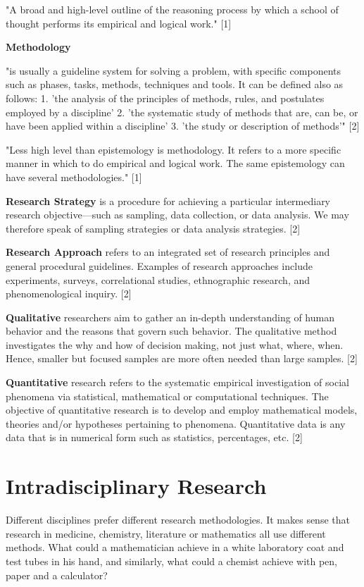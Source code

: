 "A broad and high-level outline of the reasoning process by which a school of thought performs its empirical and logical work." [1]

\textbf{Methodology}

"is usually a guideline system for solving a problem, with specific components such as phases, tasks, methods, techniques and tools. It can be defined also as follows: 1.	'the analysis of the principles of methods, rules, and postulates employed by a discipline' 2.	'the systematic study of methods that are, can be, or have been applied within a discipline' 3.	'the study or description of methods'" [2]

"Less high level than epistemology is methodology. It refers to a more specific manner in which to do empirical and logical work. The same epistemology can have several methodologies." [1]

\textbf{Research Strategy}
is a procedure for achieving a particular intermediary research objective—such as sampling, data collection, or data analysis. We may therefore speak of sampling strategies or data analysis strategies. [2]

\textbf{Research Approach}
refers to an integrated set of research principles and general procedural guidelines. Examples of research approaches include experiments, surveys, correlational studies, ethnographic research, and phenomenological inquiry. [2]

\textbf{Qualitative}
researchers aim to gather an in-depth understanding of human behavior and the reasons that govern such behavior. The qualitative method investigates the why and how of decision making, not just what, where, when. Hence, smaller but focused samples are more often needed than large samples. [2]

\textbf{Quantitative}
research refers to the systematic empirical investigation of social phenomena via statistical, mathematical or computational techniques. The objective of quantitative research is to develop and employ mathematical models, theories and/or hypotheses pertaining to phenomena. Quantitative data is any data that is in numerical form such as statistics, percentages, etc. [2]


\section{Intradisciplinary Research}

Different disciplines prefer different research methodologies. It makes sense that research in medicine, chemistry, literature or mathematics all use different methods. What could a mathematician achieve in a white laboratory coat and test tubes in his hand, and similarly, what could a chemist achieve with pen, paper and a calculator?

